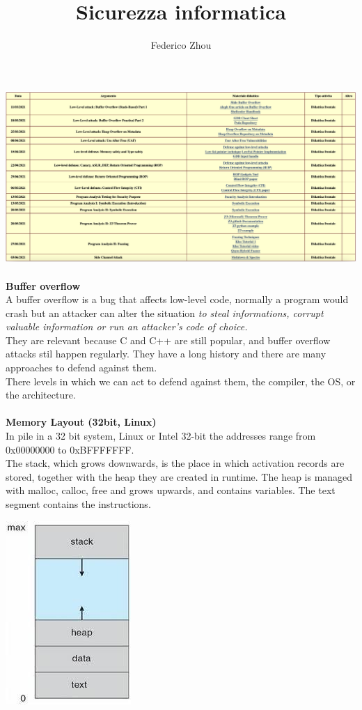 \documentclass[11pt, oneside]{article}   	%
\title{Sicurezza informatica}
\author{Federico Zhou}
\begin{document}
\maketitle
\includegraphics[scale=0.3]{programma}
\\\\
\textbf{Buffer overflow}\\
A buffer overflow is a bug that affects low-level code, normally a program would crash but an attacker can alter the situation \emph{to steal informations, corrupt valuable information or run an attacker's code of choice.}\\
They are relevant because C and C++ are still popular, and buffer overflow attacks stil happen regularly.
They have a long history and there are many approaches to defend against them.\\
There levels in which we can act to defend against them, the compiler, the OS, or the architecture.\\\\
\textbf{Memory Layout (32bit, Linux)}\\
In pile in a 32 bit system, Linux or Intel 32-bit the addresses range from 0x00000000 to 0xBFFFFFFF.\\
The stack, which grows downwards, is the place in which activation records are stored, together with the heap they are created in runtime. The heap is managed with malloc, calloc, free and grows upwards, and contains variables. The text segment contains the instructions.\\
\begin{center}
\includegraphics[scale = 0.5]{heapstack}
\end{center}
\end{document}
